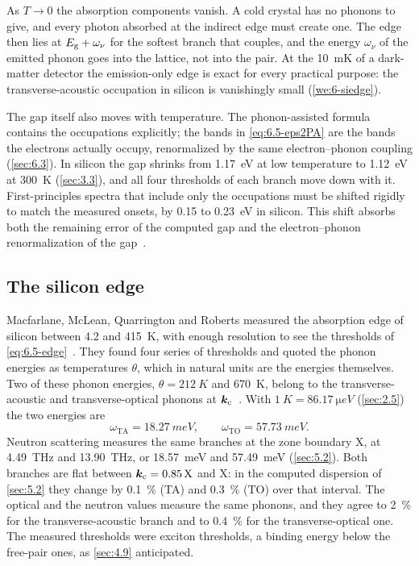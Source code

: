 As $T \to 0$ the absorption components vanish. A cold crystal has no phonons to give, and every photon absorbed at the indirect edge must create one. The edge then lies at $E_{\mathrm{g}} + \omega_\nu$ for the softest branch that couples, and the energy $\omega_\nu$ of the emitted phonon goes into the lattice, not into the pair. At the \SI{10}{mK} of a dark-matter detector the emission-only edge is exact for every practical purpose: the transverse-acoustic occupation in silicon is vanishingly small (\cref{we:6-siedge}).

The gap itself also moves with temperature. The phonon-assisted formula contains the occupations explicitly; the bands in \cref{eq:6.5-eps2PA} are the bands the electrons actually occupy, renormalized by the same electron--phonon coupling (\cref{sec:6.3}). In silicon the gap shrinks from \SI{1.17}{eV} at low temperature to \SI{1.12}{eV} at \SI{300}{K} (\cref{sec:3.3}), and all four thresholds of each branch move down with it. First-principles spectra that include only the occupations must be shifted rigidly to match the measured onsets, by 0.15 to \SI{0.23}{eV} in silicon. This shift absorbs both the remaining error of the computed gap and the electron--phonon renormalization of the gap~\cite{noffsinger2012phonon}.

\subsection{The silicon edge}

Macfarlane, McLean, Quarrington and Roberts measured the absorption edge of silicon between \SI{4.2}{} and \SI{415}{K}, with enough resolution to see the thresholds of \cref{eq:6.5-edge}~\cite{macfarlane1958fine}. They found four series of thresholds and quoted the phonon energies as temperatures $\theta$, which in natural units are the energies themselves. Two of these phonon energies, $\theta = \SI{212}{K}$ and \SI{670}{K}, belong to the transverse-acoustic and transverse-optical phonons at $\bm{k}_{\mathrm{c}}$~\cite[Chap.~6]{yu2010fundamentals}. With $\SI{1}{K} = \SI{86.17}{\micro eV}$ (\cref{sec:2.5}) the two energies are
\begin{equation*}
  \omega_{\mathrm{TA}} = \SI{18.27}{meV}, \qquad \omega_{\mathrm{TO}} = \SI{57.73}{meV} .
\end{equation*}
Neutron scattering measures the same branches at the zone boundary X, at \SI{4.49}{THz} and \SI{13.90}{THz}, or \SI{18.57}{meV} and \SI{57.49}{meV} (\cref{sec:5.2}). Both branches are flat between $\bm{k}_{\mathrm{c}} = 0.85\,\mathrm{X}$ and X: in the computed dispersion of \cref{sec:5.2} they change by \SI{0.1}{\percent} (TA) and \SI{0.3}{\percent} (TO) over that interval. The optical and the neutron values measure the same phonons, and they agree to \SI{2}{\percent} for the transverse-acoustic branch and to \SI{0.4}{\percent} for the transverse-optical one. The measured thresholds were exciton thresholds, a binding energy below the free-pair ones, as \cref{sec:4.9} anticipated.

